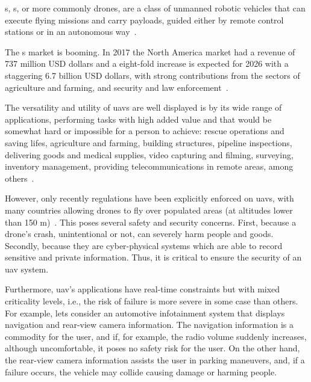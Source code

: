 
s, s, or more commonly drones, are a class of
unmanned robotic vehicles that can execute flying missions and carry payloads,
guided either by remote control stations or in an autonomous
way~\cite{alladi2022UAVBlockain,glossner2021overview}.

The s market is booming. In 2017 the North America market had a revenue of
737 million USD dollars and a eight-fold increase is expected for 2026 with a
staggering 6.7 billion USD dollars, with strong contributions from the sectors
of agriculture and farming, and security and law
enforcement~\cite{mohsan2022towards}.

The versatility and utility of \glspl{uav} are well displayed is by its wide
range of applications, performing tasks with high added value and that would be
somewhat hard or impossible for a person to achieve: rescue operations and
saving lifes, agriculture and farming, building structures, pipeline
inspections, delivering goods and medical supplies, video capturing and filming,
surveying, inventory management, providing telecommunications in remote areas,
among others~\cite{alladi2022UAVBlockain}.

However, only recently regulations have been explicitly enforced on \glspl{uav},
with many countries allowing drones to fly over populated areas (at altitudes
lower than 150 m)~\cite{nassi2021sok}. This poses several safety and security
concerns. First, because a drone's crash, unintentional or not, can severely
harm people and goods. Secondly, because they are cyber-physical systems which
are able to record sensitive and private information. Thus,
it is critical to ensure the security of an \gls{uav} system.

Furthermore, \gls{uav}'s applications have real-time constraints but with mixed
criticality levels, i.e., the risk of failure is more severe in some case than others.
For example, lets consider an automotive infotainment system that displays
navigation and rear-view camera information. The navigation information is a
commodity for the user, and if, for example, the radio volume suddenly
increases, although uncomfortable, it poses no safety risk for the user. On the
other hand, the rear-view camera information assists the user in parking
maneuvers, and, if a failure occurs, the vehicle may collide causing damage or
harming people.

